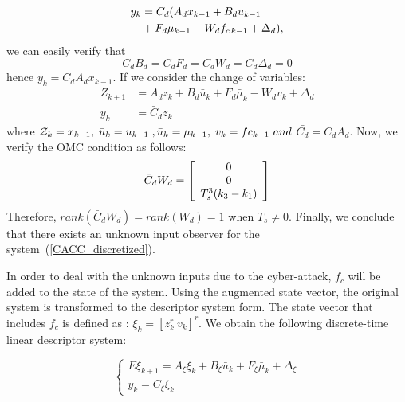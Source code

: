 \documentclass[letterpaper, 10 pt, conference]{ieeeconf}  %
\def\eqref#1{(\ref{#1})}
\begin{document}
\begin{align}
y_{k}&=C_{d}(A_{d}x_{k-1}+B_{d}u_{k-1}\notag \\
     &+F_{d}\mu_{k-1}-W_{d}f_{c\,k-1}+\Delta_{d}),   
\end{align}
we can easily verify that $$C_{d}B_{d}=C_{d}F_{d}=C_{d}W_{d}=C_{d}\Delta_{d}=0$$
hence $y_{k}=C_{d}A_{d}x_{k-1}.$
If we consider the change of variables:
\begin{equation}
    \begin{aligned}
        {Z_{k+1}} &=A_{d}z_{k}+B_{d}\bar{u}_{k}+F_{d}\bar{\mu}_{k}-W_{d}v_{k}+\Delta_{d}\\ 
        y_{k} &=\bar{C}_{d}z_{k}
    \end{aligned}
\end{equation}
where ${\cal Z}_{k}=x_{k-1},\;\bar{u}_{k}=u_{k-1}\;,\bar{u}_{k}=\mu_{k-1},\;v_{k}=fc_{k-1}\ and$ $\bar{C_d} = C_{d}A_{d}$.
Now, we verify the OMC condition as follows: 
\begin{equation}
    \bar{C}_{d}W_{d}=\left[\begin{array}{c c c}
    0 \\
    0 \\
    {{T_{s}^{3}(k_{3}-k_{1})}}
    \end{array}\right]
\end{equation}
Therefore, $rank(\bar{C}_{d}W_{d})=rank(W_{d}) = 1$ when $T_s \neq 0 $. Finally, we conclude that there exists an unknown input observer for the system~\eqref{CACC_discretized}.

In order to deal with the unknown inputs due to the cyber-attack, $f_c$ will be added to the state of the system. Using the augmented state vector, the original system is transformed 
to the descriptor system form. The state vector that includes $f_c$ is defined as : $\xi_{k}=[z_{k}^{r}\ v_{k}]^{r}$. We obtain the following discrete-time linear descriptor system:

\begin{equation}
    \left\{\begin{array}{c}
    E \xi_{k+1}=A_{\xi} \xi_k+B_{\xi} \bar{u}_k+F_{\xi} \bar{\mu}_k+\Delta_{\xi} \\
    y_k=C_{\xi} \xi_k
    \end{array}\right.
\end{equation}
\end{document}
